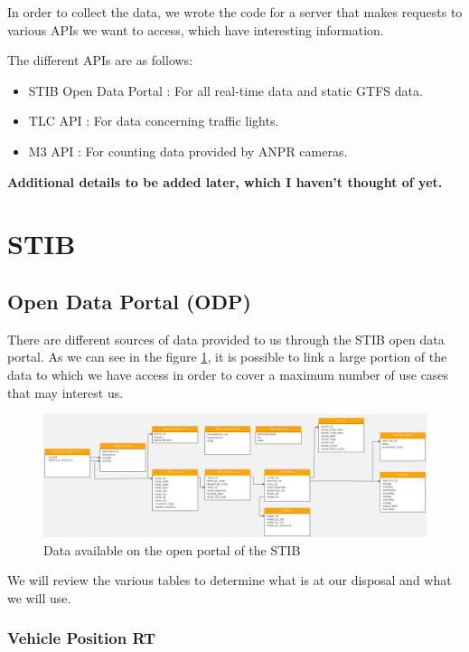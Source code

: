 \documentclass[12pt]{report}
\begin{document}
	In order to collect the data, we wrote the code for a server that makes requests to various APIs we want to access, which have interesting information.
	
	The different APIs are as follows:
	
	\begin{itemize}[noitemsep]
		\item STIB Open Data Portal : For all real-time data and static GTFS data.
		\item TLC API : For data concerning traffic lights.
		\item M3 API : For counting data provided by ANPR cameras.
	\end{itemize} 
	
	\textbf{Additional details to be added later, which I haven't thought of yet.} 
	
	
	\section{STIB}
	
	\subsection{Open Data Portal (ODP)}
	
	
	There are different sources of data provided to us through the STIB open data portal. As we can see in the figure \ref{STIB ODP}, it is possible to link a large portion of the data to which we have access in order to cover a maximum number of use cases that may interest us.
	
	
	\begin{figure}
		\centering
		\includegraphics[angle=90,origin=c,scale=0.7]{images/tables GTFS.png}
		\caption{Data available on the open portal of the STIB}
		\label{STIB ODP}
	\end{figure}
	
	 We will review the various tables to determine what is at our disposal and what we will use.
	
	\subsubsection{Vehicle Position RT}
	
\end{document}
